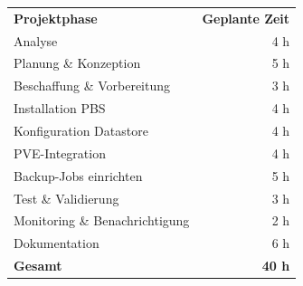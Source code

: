 \begin{tabular}{lr}
\rowcolor{heading}\textbf{Projektphase} & \textbf{Geplante Zeit} \\
Analyse                                            &  4 h \\
\rowcolor{odd}Planung \& Konzeption                &  5 h \\
Beschaffung \& Vorbereitung                        &  3 h \\
\rowcolor{odd}Installation \ac{PBS}                &  4 h \\
Konfiguration Datastore                            &  4 h \\
\rowcolor{odd}\ac{PVE}-Integration                 &  4 h \\
Backup-Jobs einrichten                             &  5 h \\
\rowcolor{odd}Test \& Validierung                  &  3 h \\
Monitoring \& Benachrichtigung                     &  2 h \\
\rowcolor{odd}Dokumentation                        &  6 h \\
\hline
\hline
\textbf{Gesamt}                                    & \textbf{40 h} \\
\end{tabular}
